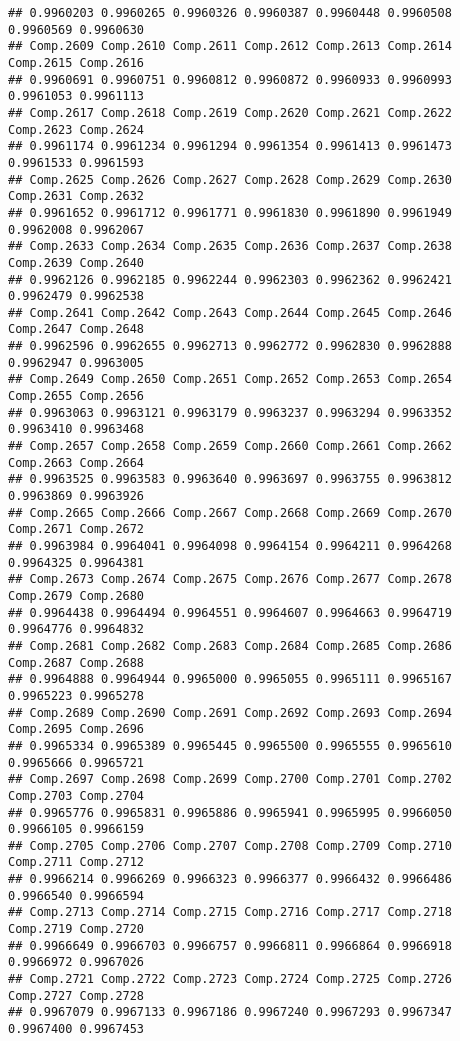 \documentclass[
]{article}
\begin{document}
\begin{verbatim}
## 0.9960203 0.9960265 0.9960326 0.9960387 0.9960448 0.9960508 0.9960569 0.9960630 
## Comp.2609 Comp.2610 Comp.2611 Comp.2612 Comp.2613 Comp.2614 Comp.2615 Comp.2616 
## 0.9960691 0.9960751 0.9960812 0.9960872 0.9960933 0.9960993 0.9961053 0.9961113 
## Comp.2617 Comp.2618 Comp.2619 Comp.2620 Comp.2621 Comp.2622 Comp.2623 Comp.2624 
## 0.9961174 0.9961234 0.9961294 0.9961354 0.9961413 0.9961473 0.9961533 0.9961593 
## Comp.2625 Comp.2626 Comp.2627 Comp.2628 Comp.2629 Comp.2630 Comp.2631 Comp.2632 
## 0.9961652 0.9961712 0.9961771 0.9961830 0.9961890 0.9961949 0.9962008 0.9962067 
## Comp.2633 Comp.2634 Comp.2635 Comp.2636 Comp.2637 Comp.2638 Comp.2639 Comp.2640 
## 0.9962126 0.9962185 0.9962244 0.9962303 0.9962362 0.9962421 0.9962479 0.9962538 
## Comp.2641 Comp.2642 Comp.2643 Comp.2644 Comp.2645 Comp.2646 Comp.2647 Comp.2648 
## 0.9962596 0.9962655 0.9962713 0.9962772 0.9962830 0.9962888 0.9962947 0.9963005 
## Comp.2649 Comp.2650 Comp.2651 Comp.2652 Comp.2653 Comp.2654 Comp.2655 Comp.2656 
## 0.9963063 0.9963121 0.9963179 0.9963237 0.9963294 0.9963352 0.9963410 0.9963468 
## Comp.2657 Comp.2658 Comp.2659 Comp.2660 Comp.2661 Comp.2662 Comp.2663 Comp.2664 
## 0.9963525 0.9963583 0.9963640 0.9963697 0.9963755 0.9963812 0.9963869 0.9963926 
## Comp.2665 Comp.2666 Comp.2667 Comp.2668 Comp.2669 Comp.2670 Comp.2671 Comp.2672 
## 0.9963984 0.9964041 0.9964098 0.9964154 0.9964211 0.9964268 0.9964325 0.9964381 
## Comp.2673 Comp.2674 Comp.2675 Comp.2676 Comp.2677 Comp.2678 Comp.2679 Comp.2680 
## 0.9964438 0.9964494 0.9964551 0.9964607 0.9964663 0.9964719 0.9964776 0.9964832 
## Comp.2681 Comp.2682 Comp.2683 Comp.2684 Comp.2685 Comp.2686 Comp.2687 Comp.2688 
## 0.9964888 0.9964944 0.9965000 0.9965055 0.9965111 0.9965167 0.9965223 0.9965278 
## Comp.2689 Comp.2690 Comp.2691 Comp.2692 Comp.2693 Comp.2694 Comp.2695 Comp.2696 
## 0.9965334 0.9965389 0.9965445 0.9965500 0.9965555 0.9965610 0.9965666 0.9965721 
## Comp.2697 Comp.2698 Comp.2699 Comp.2700 Comp.2701 Comp.2702 Comp.2703 Comp.2704 
## 0.9965776 0.9965831 0.9965886 0.9965941 0.9965995 0.9966050 0.9966105 0.9966159 
## Comp.2705 Comp.2706 Comp.2707 Comp.2708 Comp.2709 Comp.2710 Comp.2711 Comp.2712 
## 0.9966214 0.9966269 0.9966323 0.9966377 0.9966432 0.9966486 0.9966540 0.9966594 
## Comp.2713 Comp.2714 Comp.2715 Comp.2716 Comp.2717 Comp.2718 Comp.2719 Comp.2720 
## 0.9966649 0.9966703 0.9966757 0.9966811 0.9966864 0.9966918 0.9966972 0.9967026 
## Comp.2721 Comp.2722 Comp.2723 Comp.2724 Comp.2725 Comp.2726 Comp.2727 Comp.2728 
## 0.9967079 0.9967133 0.9967186 0.9967240 0.9967293 0.9967347 0.9967400 0.9967453 

\end{verbatim}
\end{document}
